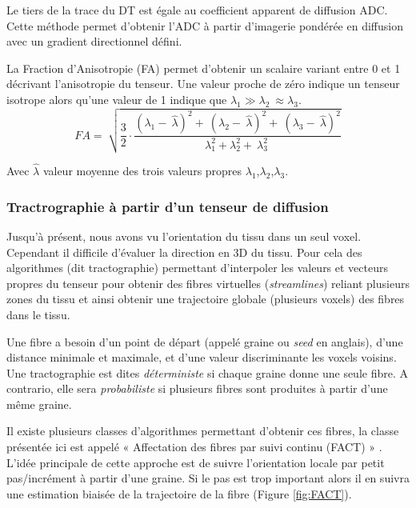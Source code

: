 Le tiers de la trace du DT est égale au coefficient apparent de diffusion ADC. Cette méthode permet d’obtenir l’ADC à partir d’imagerie pondérée en diffusion avec un gradient directionnel défini.

La Fraction d’Anisotropie (FA) permet d’obtenir un scalaire variant entre 0 et 1 décrivant l’anisotropie du tenseur. Une valeur proche de zéro indique un tenseur isotrope alors qu’une valeur de 1 indique que $\lambda_1\gg\lambda_2\ \approx\lambda_3$.
\begin{equation}
\nonumber
FA=\ \sqrt{\frac{3}{2}\cdot\frac{{(\lambda_1-\ \hat{\lambda})}^2+\ {(\lambda_2-\ \hat{\lambda})}^2+\ {(\lambda_3-\ \hat{\lambda})}^2}{\lambda_1^2+\lambda_2^2+\ \lambda_3^2\ }}
\end{equation}

Avec $\hat{\lambda}$ valeur moyenne des trois valeurs propres $\lambda_1$,$\lambda_2$,$\lambda_3$.

\subsubsection{Tractrographie à partir d’un tenseur de diffusion}

Jusqu’à présent, nous avons vu l’orientation du tissu dans un seul voxel. Cependant il difficile d’évaluer la direction en 3D du tissu. Pour cela des algorithmes (dit tractographie) permettant d’interpoler les valeurs et vecteurs propres du tenseur pour obtenir des fibres virtuelles (\textit{streamlines}) reliant plusieurs zones du tissu et ainsi obtenir une trajectoire globale (plusieurs voxels) des fibres dans le tissu.

Une fibre a besoin d’un point de départ (appelé graine ou \textit{seed} en anglais), d’une distance minimale et maximale, et d’une valeur discriminante les voxels voisins. Une tractographie est dites \textit{déterministe} si chaque graine donne une seule fibre. A contrario, elle sera \textit{probabiliste} si plusieurs fibres sont produites à partir d’une même graine.

Il existe plusieurs classes d’algorithmes permettant d’obtenir ces fibres, la classe présentée ici est appelé « Affectation des fibres par suivi continu (FACT) » \cite{Mori1999}. L’idée principale de cette approche est de suivre l’orientation locale par petit pas/incrément à partir d’une graine. Si le pas est trop important alors il en suivra une estimation biaisée de la trajectoire de la fibre (Figure \ref{fig:FACT}).

